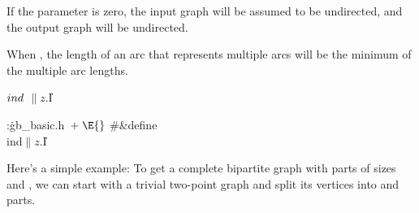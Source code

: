 If the  parameter is zero, the input graph will be assumed to
be undirected, and the output graph will be undirected.

When , the length of an arc that represents multiple
arcs
will be the minimum of the multiple arc lengths.

\Y\B\4\D$\\{ind}$ \5
$\|z.{}$\|I\par
\Y\B\4:\.{gb\_basic.h\,}\X${}\mathrel+\E{}$\6
\8\#\&{define} \\{ind}\5${}\|z.{}$\|I\par
\fi

Here's a simple example: To get a complete bipartite graph with
parts of sizes  and , we can start with a trivial
two-point
graph and split its vertices into  and  parts.

